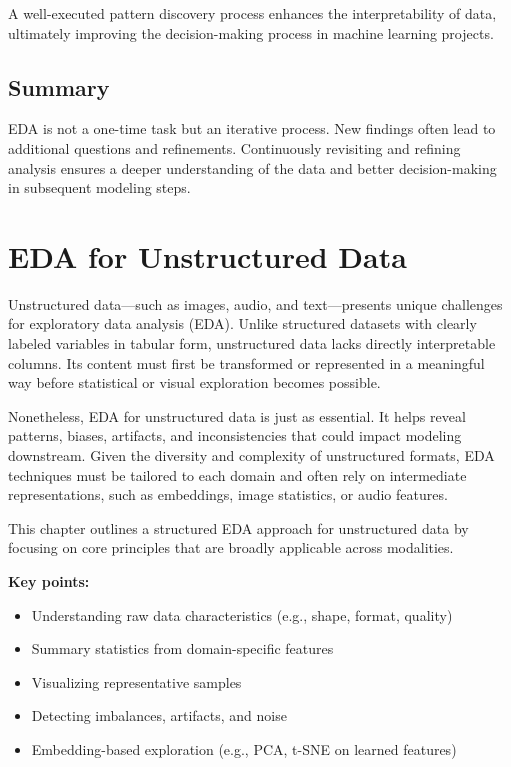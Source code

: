 \documentclass[12pt,openany, draft]{book}
\begin{document}
A well-executed pattern discovery process enhances the interpretability of data, ultimately improving the decision-making process in machine learning projects.


\section{Summary}
EDA is not a one-time task but an iterative process. New findings often lead to additional questions and refinements. Continuously revisiting and refining analysis ensures a deeper understanding of the data and better decision-making in subsequent modeling steps.



\chapter{EDA for Unstructured Data}

Unstructured data—such as images, audio, and text—presents unique 
challenges for exploratory data analysis (EDA). Unlike structured datasets 
with clearly labeled variables in tabular form, unstructured data lacks 
directly interpretable columns. Its content must first be transformed 
or represented in a meaningful way before statistical or visual 
exploration becomes possible. \newline

Nonetheless, EDA for unstructured data is just as essential. It helps 
reveal patterns, biases, artifacts, and inconsistencies that could 
impact modeling downstream. Given the diversity and complexity of 
unstructured formats, EDA techniques must be tailored to each domain 
and often rely on intermediate representations, such as embeddings, 
image statistics, or audio features. \newline

This chapter outlines a structured EDA approach for unstructured data 
by focusing on core principles that are broadly applicable across 
modalities.
\newline

\textbf{Key points:}
\begin{itemize}
    \item Understanding raw data characteristics (e.g., shape, format, quality)
    \item Summary statistics from domain-specific features 
    \item Visualizing representative samples
    \item Detecting imbalances, artifacts, and noise
    \item Embedding-based exploration (e.g., PCA, t-SNE on learned features)
\end{itemize}
\end{document}
